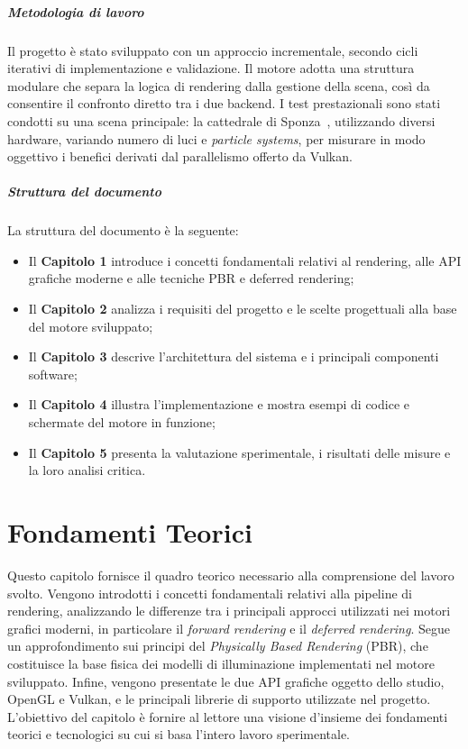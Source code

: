 \documentclass[12pt,a4paper,openright,twoside]{book}
\begin{document}
\paragraph{Metodologia di lavoro}
Il progetto è stato sviluppato con un approccio incrementale, secondo cicli iterativi di implementazione e validazione.
Il motore adotta una struttura modulare che separa la logica di rendering dalla gestione della scena, così da consentire
il confronto diretto tra i due backend.
I test prestazionali sono stati condotti su una scena principale: la cattedrale di Sponza~\cite{sponza_original,sponza_intel2022},
utilizzando diversi hardware, variando numero di luci e \emph{particle systems}, per misurare in modo oggettivo i benefici derivati
dal parallelismo offerto da Vulkan.

\paragraph{Struttura del documento}
La struttura del documento è la seguente:
\begin{itemize}
   \item Il \textbf{Capitolo 1} introduce i concetti fondamentali relativi al rendering, alle API grafiche moderne e alle tecniche PBR e deferred rendering;
   \item Il \textbf{Capitolo 2} analizza i requisiti del progetto e le scelte progettuali alla base del motore sviluppato;
   \item Il \textbf{Capitolo 3} descrive l'architettura del sistema e i principali componenti software;
   \item Il \textbf{Capitolo 4} illustra l'implementazione e mostra esempi di codice e schermate del motore in funzione;
   \item Il \textbf{Capitolo 5} presenta la valutazione sperimentale, i risultati delle misure e la loro analisi critica.
\end{itemize}

\chapter{Fondamenti Teorici}
\label{chap:fondamenti-teorici}
\noindent
Questo capitolo fornisce il quadro teorico necessario alla comprensione del lavoro svolto.
Vengono introdotti i concetti fondamentali relativi alla pipeline di rendering,
analizzando le differenze tra i principali approcci utilizzati nei motori grafici moderni,
in particolare il \emph{forward rendering} e il \emph{deferred rendering}.
Segue un approfondimento sui principi del \emph{Physically Based Rendering} (PBR),
che costituisce la base fisica dei modelli di illuminazione implementati nel motore sviluppato.
Infine, vengono presentate le due API grafiche oggetto dello studio, OpenGL e Vulkan,
e le principali librerie di supporto utilizzate nel progetto.
L'obiettivo del capitolo è fornire al lettore una visione d'insieme dei fondamenti teorici e tecnologici
su cui si basa l'intero lavoro sperimentale.
\end{document}
